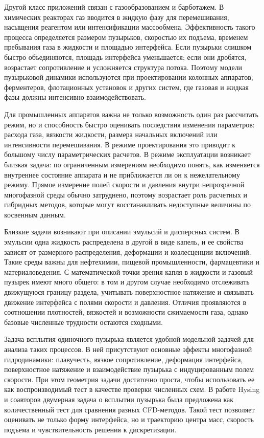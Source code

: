 Другой класс приложений связан с газообразованием и барботажем. В химических
реакторах газ вводится в жидкую фазу для перемешивания, насыщения реагентом или
интенсификации массообмена. Эффективность такого процесса определяется
размером пузырьков, скоростью их подъема, временем пребывания газа в жидкости и
площадью интерфейса. Если пузырьки слишком быстро объединяются,
площадь интерфейса уменьшается; если они дробятся, возрастает сопротивление и
усложняется структура потока. Поэтому модели пузырьковой динамики используются
при проектировании колонных аппаратов, ферментеров, флотационных установок и
других систем, где газовая и жидкая фазы должны интенсивно взаимодействовать.

Для промышленных аппаратов важна не только возможность один раз рассчитать
режим, но и способность быстро оценивать последствия изменения параметров:
расхода газа, вязкости жидкости, размера начальных включений или интенсивности
перемешивания. В режиме проектирования это приводит к большому числу
параметрических расчетов. В режиме эксплуатации возникает близкая задача: по
ограниченным измерениям необходимо понять, как изменяется внутреннее состояние
аппарата и не приближается ли он к нежелательному режиму. Прямое измерение
полей скорости и давления внутри непрозрачной многофазной среды обычно
затруднено, поэтому возрастает роль расчетных и гибридных методов, которые
могут восстанавливать недоступные величины по косвенным данным.

Близкие задачи возникают при описании эмульсий и дисперсных систем. В эмульсии
одна жидкость распределена в другой в виде капель, и ее свойства зависят от
размерного распределения, деформации и коалесценции включений. Такие среды
важны для нефтехимии, пищевой промышленности, фармацевтики и материаловедения.
С математической точки зрения капля в жидкости и газовый пузырек имеют много
общего: в том и другом случае необходимо отслеживать движущуюся границу раздела,
учитывать поверхностное натяжение и связывать движение интерфейса с полями
скорости и давления. Отличия проявляются в соотношении плотностей, вязкостей и
возможности сжимаемости газа, однако базовые численные трудности остаются
сходными.

Задача всплытия одиночного пузырька является удобной модельной задачей для
анализа таких процессов. В ней присутствуют основные эффекты многофазной
гидродинамики: плавучесть, вязкое сопротивление, деформация интерфейса,
поверхностное натяжение и взаимодействие пузырька с индуцированным полем
скорости. При этом геометрия задачи достаточно проста, чтобы использовать ее
как воспроизводимый тест в качестве проверки численных схем. В работе Hysing и соавторов
\cite{Hysing2009} двумерная задача о всплытии пузырька была предложена как
количественный тест для сравнения разных CFD-методов. Такой тест позволяет
оценивать не только форму интерфейса, но и траекторию центра масс, скорость
подъема и чувствительность решения к дискретизации.

